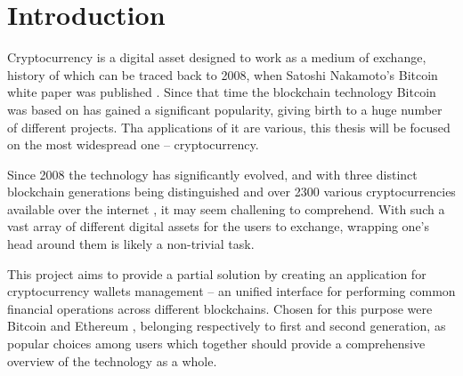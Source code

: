 \chapter{Introduction}

Cryptocurrency is a digital asset designed to work as a medium of exchange,
history of which can be traced back to 2008, when Satoshi Nakamoto's
Bitcoin white paper was published \cite{bitcoin-white-paper}.
Since that time the blockchain technology
Bitcoin was based on has gained a significant popularity,
giving birth to a huge number of different projects.
Tha applications of it are various,
this thesis will be focused on the most widespread one -- cryptocurrency.

Since 2008 the technology has significantly evolved,
and with three distinct blockchain generations being distinguished \cite{blockchain-generations}
and over 2300 various cryptocurrencies available over the internet \cite{cryptocurrency-list},
it may seem challening to comprehend.
With such a vast array of different digital assets for the users to exchange,
wrapping one's head around them is likely a non-trivial task.

This project aims to provide a partial solution by creating
an application for cryptocurrency wallets management
-- an unified interface for performing common financial operations
across different blockchains.
Chosen for this purpose were Bitcoin and Ethereum \cite{ethereum-white-paper},
belonging respectively to first and second generation,
as popular choices among users \cite{currencies-popularity} which together should provide
a comprehensive overview of the technology as a whole.
